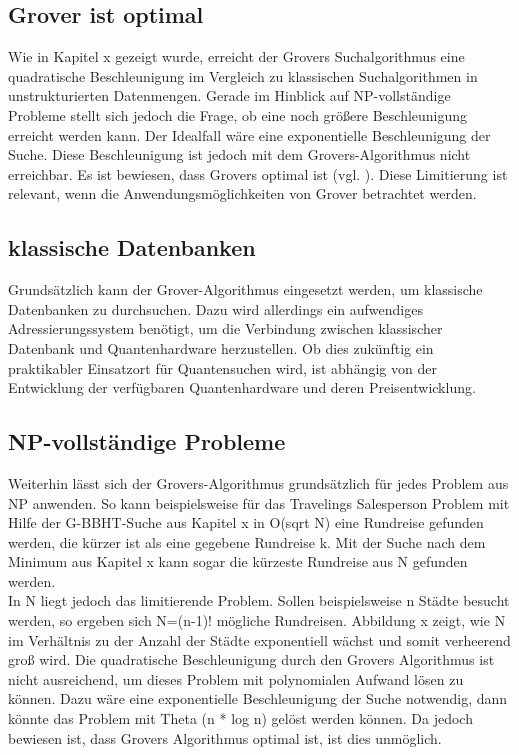 \subsection{Grover ist optimal}
Wie in Kapitel x gezeigt wurde, erreicht der Grovers Suchalgorithmus eine quadratische Beschleunigung im Vergleich zu klassischen Suchalgorithmen in unstrukturierten Datenmengen. Gerade im Hinblick auf NP-vollständige Probleme stellt sich jedoch die Frage, ob eine noch größere Beschleunigung erreicht werden kann. Der Idealfall wäre eine exponentielle Beschleunigung der Suche. Diese Beschleunigung ist jedoch mit dem Grovers-Algorithmus nicht erreichbar. Es ist bewiesen, dass Grovers optimal ist (vgl. ). Diese Limitierung ist relevant, wenn die Anwendungsmöglichkeiten von Grover betrachtet werden.
\subsection{klassische Datenbanken}
Grundsätzlich kann der Grover-Algorithmus eingesetzt werden, um klassische Datenbanken zu durchsuchen. Dazu wird allerdings ein aufwendiges Adressierungssystem benötigt, um die Verbindung zwischen klassischer Datenbank und Quantenhardware herzustellen. Ob dies zukünftig ein praktikabler Einsatzort für Quantensuchen wird, ist abhängig von der Entwicklung der verfügbaren Quantenhardware und deren Preisentwicklung.
\subsection{NP-vollständige Probleme}
Weiterhin lässt sich der Grovers-Algorithmus grundsätzlich für jedes Problem aus NP anwenden. So kann beispielsweise für das Travelings Salesperson Problem mit Hilfe der G-BBHT-Suche aus Kapitel x in O(sqrt N) eine Rundreise gefunden werden, die kürzer ist als eine gegebene Rundreise k. Mit der Suche nach dem Minimum aus Kapitel x kann sogar die kürzeste Rundreise aus N gefunden werden.
\\
In N liegt jedoch das limitierende Problem. Sollen beispielsweise n Städte besucht werden, so ergeben sich N=(n-1)! mögliche Rundreisen. Abbildung x zeigt, wie N im Verhältnis zu der Anzahl der Städte exponentiell wächst und somit verheerend groß wird. Die quadratische Beschleunigung durch den Grovers Algorithmus ist nicht ausreichend, um dieses Problem mit polynomialen Aufwand lösen zu können. Dazu wäre eine exponentielle Beschleunigung der Suche notwendig, dann könnte das Problem mit Theta (n * log n) gelöst werden können. Da jedoch bewiesen ist, dass Grovers Algorithmus optimal ist, ist dies unmöglich.